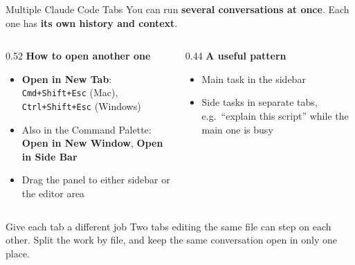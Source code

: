 \documentclass[aspectratio=169, 11pt]{beamer}
\begin{document}
\begin{frame}{Multiple Claude Code Tabs}
  You can run \textbf{several conversations at once}. Each one has \textbf{its own history and context}.

  \vspace{0.5em}
  \begin{columns}[T]
    \begin{column}{0.52\textwidth}
      \textbf{How to open another one}
      \begin{itemize}
        \item \textbf{Open in New Tab}: \texttt{Cmd+Shift+Esc} (Mac), \texttt{Ctrl+Shift+Esc} (Windows)
        \item Also in the Command Palette: \textbf{Open in New Window}, \textbf{Open in Side Bar}
        \item Drag the panel to either sidebar or the editor area
      \end{itemize}
    \end{column}
    \begin{column}{0.44\textwidth}
      \textbf{A useful pattern}
      \begin{itemize}
        \item Main task in the sidebar
        \item Side tasks in separate tabs, e.g.\ ``explain this script'' while the main one is busy
      \end{itemize}
    \end{column}
  \end{columns}

  \vspace{0.6em}
  \begin{alertblock}{Give each tab a different job}
    Two tabs editing the same file can step on each other. Split the work by file, and keep the same conversation open in only one place.
  \end{alertblock}

\end{frame}
\end{document}
